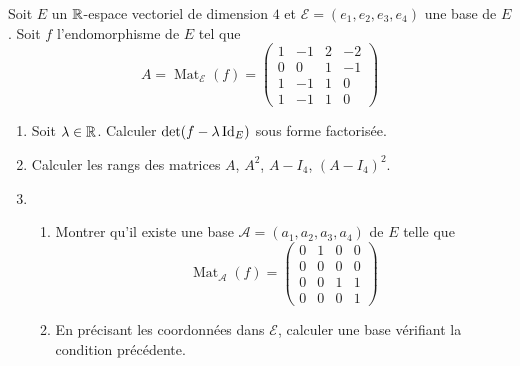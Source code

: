 Soit $E$ un $\mathbb{R}$-espace vectoriel de dimension $4$ et $\mathcal{E}=(e_1,e_2,e_3,e_4)$ une base de $E$. Soit $f$ l'endomorphisme de $E$ tel que
\begin{displaymath}
A = \mathop{\mathrm{Mat}}_{\mathcal E}(f)=
\begin{pmatrix}
 1 & -1 & 2 & -2 \\ 0 & 0 & 1 & -1 \\ 1 & -1 & 1 & 0\\1 & -1 & 1 & 0
\end{pmatrix}
\end{displaymath}
\begin{enumerate}
 \item Soit $\lambda\in \mathbb{R}$. Calculer $\det(f-\lambda \operatorname{Id}_E)$ sous forme factorisée.
 \item Calculer les rangs des matrices $A$, $A^2$, $A-I_4$, $(A-I_4)^2$.
 \item 
\begin{enumerate}
 \item Montrer qu'il existe une base $\mathcal{A}=(a_1,a_2,a_3,a_4)$ de $E$ telle que
\begin{displaymath}
 \mathop{\mathrm{Mat}}_{\mathcal A}(f)=
\begin{pmatrix}
 0 & 1 & 0 & 0 \\ 0 & 0 & 0 & 0 \\ 0 & 0 & 1 & 1\\0 & 0 & 0 & 1
\end{pmatrix}
\end{displaymath}
\item En précisant les coordonnées dans $\mathcal{E}$, calculer une base vérifiant la condition précédente.
\end{enumerate}

\end{enumerate}
